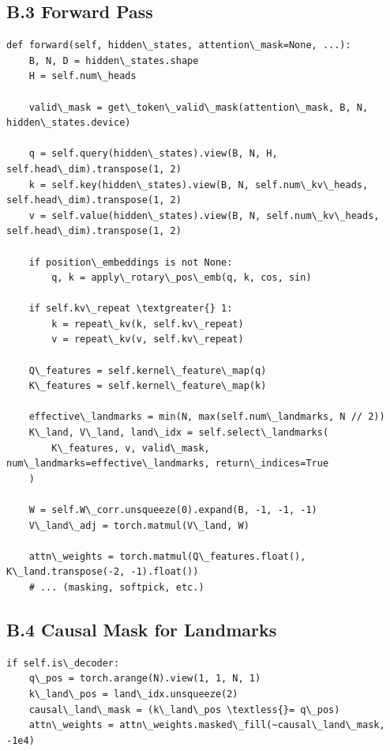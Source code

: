 \subsection{B.3 Forward Pass}

\begin{lstlisting}
def forward(self, hidden\_states, attention\_mask=None, ...):
    B, N, D = hidden\_states.shape
    H = self.num\_heads
    
    valid\_mask = get\_token\_valid\_mask(attention\_mask, B, N, hidden\_states.device)
    
    q = self.query(hidden\_states).view(B, N, H, self.head\_dim).transpose(1, 2)
    k = self.key(hidden\_states).view(B, N, self.num\_kv\_heads, self.head\_dim).transpose(1, 2)
    v = self.value(hidden\_states).view(B, N, self.num\_kv\_heads, self.head\_dim).transpose(1, 2)
    
    if position\_embeddings is not None:
        q, k = apply\_rotary\_pos\_emb(q, k, cos, sin)
    
    if self.kv\_repeat \textgreater{} 1:
        k = repeat\_kv(k, self.kv\_repeat)
        v = repeat\_kv(v, self.kv\_repeat)
    
    Q\_features = self.kernel\_feature\_map(q)
    K\_features = self.kernel\_feature\_map(k)
    
    effective\_landmarks = min(N, max(self.num\_landmarks, N // 2))
    K\_land, V\_land, land\_idx = self.select\_landmarks(
        K\_features, v, valid\_mask, num\_landmarks=effective\_landmarks, return\_indices=True
    )
    
    W = self.W\_corr.unsqueeze(0).expand(B, -1, -1, -1)
    V\_land\_adj = torch.matmul(V\_land, W)
    
    attn\_weights = torch.matmul(Q\_features.float(), K\_land.transpose(-2, -1).float())
    # ... (masking, softpick, etc.)
\end{lstlisting}

\subsection{B.4 Causal Mask for Landmarks}

\begin{lstlisting}
if self.is\_decoder:
    q\_pos = torch.arange(N).view(1, 1, N, 1)
    k\_land\_pos = land\_idx.unsqueeze(2)
    causal\_land\_mask = (k\_land\_pos \textless{}= q\_pos)
    attn\_weights = attn\_weights.masked\_fill(~causal\_land\_mask, -1e4)
\end{lstlisting}

